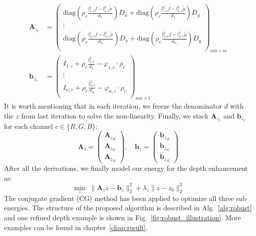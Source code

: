 \begin{equation}\label{eq:robust_depth3}
\begin{split}
    \mathbf{A}_{z_c} &= 
        \begin{pmatrix}    
            \text{diag}(\rho_c\frac{l^1_{1,c}f - l^3_{1,c}\tilde{x}}{d_1}) D_x + \text{diag}(\rho_c\frac{l^2_{1,c}f - l^3_{1,c}\tilde{y}}{d_1}) D_y \\
            \vdots \\
            \text{diag}(\rho_c\frac{l^1_{n,c}f - l^3_{n,c}\tilde{x}}{d_n}) D_x + \text{diag}(\rho_c\frac{l^2_{n,c}f - l^3_{n,c}\tilde{y}}{d_n}) D_y \\
        \end{pmatrix}_{mn \times m}
\\
    \mathbf{b}_{z_c} &=     
        \begin{pmatrix}    
            I_{1,c} + \rho_c\frac{l^3_{1,c}}{d_{1}} - \varphi_{1,c} \cdot \rho_{c} \\
            \vdots\\
            I_{n,c} + \rho_c\frac{l^3_{n,c}}{d_{n}} - \varphi_{n,c} \cdot \rho_{c} \\
        \end{pmatrix}_{mn \times 1}    
\end{split}
\end{equation}
 It is worth mentioning that in each iteration, we freeze the denominator $d$ with the $z$ from last iteration to solve the non-linearity.
 Finally, we stack $\mathbf{A}_{z_c}$ and $\mathbf{b}_{z_c}$ for each channel $c\in\{R,G,B\}$:
 \begin{equation}
     \mathbf{A}_z = 
         \begin{pmatrix}
             \mathbf{A}_{z_R}\\
             \mathbf{A}_{z_G}\\
             \mathbf{A}_{z_B}
         \end{pmatrix},\quad
     \mathbf{b}_z = 
         \begin{pmatrix}
             \mathbf{b}_{z_R}\\
             \mathbf{b}_{z_G}\\
             \mathbf{b}_{z_B}
         \end{pmatrix}         
 \end{equation}
After all the derivations, we finally model our energy for the depth enhancement as:
 \begin{equation}\label{eq:robust_depth_estimate}
    \min_{z} \; \lVert  \mathbf{A}_{z}z - \mathbf{b}_z\rVert^2_2 + \lambda_{z}\lVert z - z_0 \rVert_2^2
\end{equation}
The conjugate gradient (CG) method has been applied to optimize all three sub energies.
The structure of the proposed algorithm is described in Alg.~\ref{alg:robust} and one refined depth example is shown in Fig.~\ref{fig:robust_illustration}.
More examples can be found in chapter~\ref{chap:result}.

